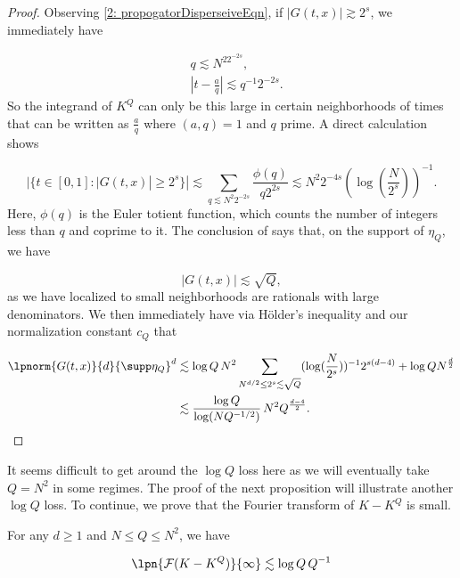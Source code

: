 \documentclass[11pt]{amsart}
\begin{document}
\begin{proof}
    Observing \eqref{2: propogatorDisperseiveEqn}, if $|G(t,x)|\gtrsim 2^s$, we immediately have 

    \begin{align*}
        &q\lesssim N^22^{-2s},\\
        &|t-\frac{a}{q}|\lesssim q^{-1}2^{-2s}.
    \end{align*}
    So the integrand of $K^Q$ can only be this large in certain neighborhoods of times that can be written as $\frac{a}{q}$ where $(a,q)=1$ and $q$ prime. A direct calculation shows

    \begin{equation*}
        |\{t\in[0,1]:|G(t,x)|\geq 2^s\}|\lesssim \sum_{q\lesssim N^2 2^{-2s}}\frac{\phi(q)}{q2^{2s}}\lesssim N^{2}2^{-4s}(\log(\frac{N}{2^s}))^{-1}.
    \end{equation*}
    Here, $\phi(q)$ is the Euler totient function, which counts the number of integers less than $q$ and coprime to it. The conclusion of  says that, on the support of $\eta_Q$, we have

    \begin{equation*}
        |G(t,x)|\lesssim \sqrt{Q},
    \end{equation*}
    as we have localized to small neighborhoods are rationals with large denominators. We then immediately have via H\"older's inequality and our normalization constant $c_Q$ that

    \begin{align*}
        \lpnorm{G(t,x)}{d}{\supp \eta_Q}^d&\lesssim \log Q\,N^2\sum_{N^{d/2}\leq 2^s \lesssim \sqrt{Q}}(\log(\frac{N}{2^s}))^{-1}2^{s(d-4)} + \log QN^{\frac{d}{2}}\\
        &\lesssim \frac{\log Q}{\log(N Q^{-1/2})}\, N^2Q^{\frac{d-4}{2}}.
    \end{align*}
\end{proof}
It seems difficult to get around the $\log Q$ loss here as we will eventually take $Q= N^2$ in some regimes. The proof of the next proposition will illustrate another $\log Q$ loss. To continue, we prove that the Fourier transform of $K-K^Q$ is small.

\begin{proposition}\label{2: KerrFourierBoundProp}
    For any $d\geq 1$ and $N\leq Q\leq N^2$, we have

    \begin{equation}\label{2: KerrFourierBoundEqn}
        \lpn{\mathcal{F}(K-K^Q)}{\infty}\lesssim \log Q\,Q^{-1}
    \end{equation}
\end{proposition}
\end{document}
